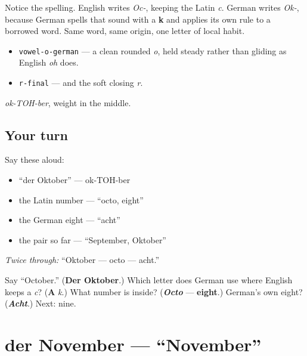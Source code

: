 Notice the spelling. English writes \emph{Oc-}, keeping the Latin \emph{c}. German writes \emph{Ok-}, because German spells that sound with a \textbf{k} and applies its own rule to a borrowed word. Same word, same origin, one letter of local habit.

\begin{sounds}
\begin{itemize}
\raggedright
  \item \texttt{vowel-o-german} — a clean rounded \emph{o}, held steady rather than gliding as English \emph{oh} does.
  \item \texttt{r-final} — and the soft closing \emph{r}.
\end{itemize}

\emph{ok-TOH-ber}, weight in the middle.
\end{sounds}

\subsection*{Your turn}
Say these aloud:

\begin{itemize}
\raggedright
  \item \textquotedblleft{}der Oktober\textquotedblright{} — ok-TOH-ber
  \item the Latin number — \textquotedblleft{}octo, eight\textquotedblright{}
  \item the German eight — \textquotedblleft{}acht\textquotedblright{}
  \item the pair so far — \textquotedblleft{}September, Oktober\textquotedblright{}
\end{itemize}

\emph{Twice through:} \textquotedblleft{}Oktober — octo — acht.\textquotedblright{}

\begin{tcolorbox}[breakable,colback=teal!4,colframe=teal!35!black,title={Before you move on}]
Say \textquotedblleft{}October.\textquotedblright{} (\textbf{Der Oktober}.) Which letter does German use where English keeps a \emph{c}? (\textbf{A} \emph{k}.) What number is inside? (\emph{\textbf{Octo}} — \textbf{eight}.) German's own eight? (\emph{\textbf{Acht}}.) Next: nine.
\end{tcolorbox}
\section[der November]{der November — \textquotedblleft{}November\textquotedblright{}}

